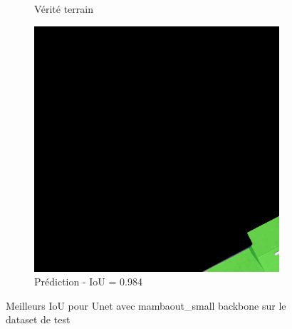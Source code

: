 \begin{figure}[H]
\begin{subfigure}{0.32\textwidth}
    \caption{Vérité terrain}
\end{subfigure}
\hfill
\begin{subfigure}{0.32\textwidth}
    \includegraphics[width=\textwidth]{02-main//figures/ch4/kfold_ensembles/unet_tu-mambaout_small/best_cases/best_2_iou0.984_24931113_tile_13_18_a66e08_overlay_pred.png}
    \caption{Prédiction - IoU = 0.984}
\end{subfigure}

\caption{Meilleurs IoU pour Unet avec mambaout\_small backbone sur le dataset de test}
\label{fig:unet_mambaoutsmall_best_cases}
\end{figure}


